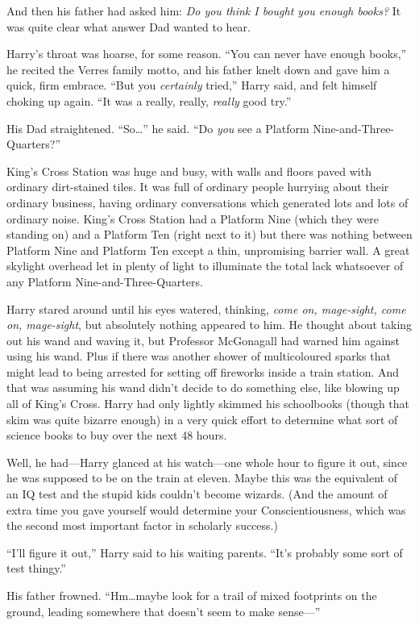 And then his father had asked him: \emph{Do you think I bought you enough books?} It was quite clear what answer Dad wanted to hear.

Harry’s throat was hoarse, for some reason. “You can never have enough books,” he recited the Verres family motto, and his father knelt down and gave him a quick, firm embrace. “But you \emph{certainly} tried,” Harry said, and felt himself choking up again. “It was a really, really, \emph{really} good try.”

His Dad straightened. “So…” he said. “Do \emph{you} see a Platform Nine-and-Three-Quarters?”

King’s Cross Station was huge and busy, with walls and floors paved with ordinary dirt-stained tiles. It was full of ordinary people hurrying about their ordinary business, having ordinary conversations which generated lots and lots of ordinary noise. King’s Cross Station had a Platform Nine (which they were standing on) and a Platform Ten (right next to it) but there was nothing between Platform Nine and Platform Ten except a thin, unpromising barrier wall. A great skylight overhead let in plenty of light to illuminate the total lack whatsoever of any Platform Nine-and-Three-Quarters.

Harry stared around until his eyes watered, thinking, \emph{come on, mage-sight, come on, mage-sight}, but absolutely nothing appeared to him. He thought about taking out his wand and waving it, but Professor McGonagall had warned him against using his wand. Plus if there was another shower of multicoloured sparks that might lead to being arrested for setting off fireworks inside a train station. And that was assuming his wand didn’t decide to do something else, like blowing up all of King’s Cross. Harry had only lightly skimmed his schoolbooks (though that skim was quite bizarre enough) in a very quick effort to determine what sort of science books to buy over the next 48 hours.

Well, he had—Harry glanced at his watch—one whole hour to figure it out, since he was supposed to be on the train at eleven. Maybe this was the equivalent of an IQ test and the stupid kids couldn’t become wizards. (And the amount of extra time you gave yourself would determine your Conscientiousness, which was the second most important factor in scholarly success.)

“I’ll figure it out,” Harry said to his waiting parents. “It’s probably some sort of test thingy.”

His father frowned. “Hm…maybe look for a trail of mixed footprints on the ground, leading somewhere that doesn’t seem to make sense—”

